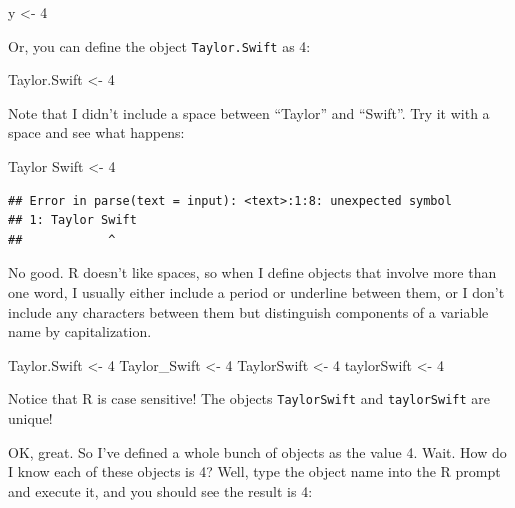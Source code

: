 \documentclass[
]{book}
\newenvironment{Shaded}{\begin{snugshade}}{\end{snugshade}}
\newcommand{\DecValTok}[1]{\textcolor[rgb]{0.00,0.00,0.81}{#1}}
\newcommand{\NormalTok}[1]{#1}
\newcommand{\OtherTok}[1]{\textcolor[rgb]{0.56,0.35,0.01}{#1}}
\begin{document}
\begin{Shaded}
\begin{Highlighting}[]
\NormalTok{y }\OtherTok{\textless{}{-}} \DecValTok{4}
\end{Highlighting}
\end{Shaded}

Or, you can define the object \texttt{Taylor.Swift} as 4:

\begin{Shaded}
\begin{Highlighting}[]
\NormalTok{Taylor.Swift }\OtherTok{\textless{}{-}} \DecValTok{4}
\end{Highlighting}
\end{Shaded}

Note that I didn't include a space between ``Taylor'' and ``Swift''. Try it with a space and see what happens:

\begin{Shaded}
\begin{Highlighting}[]
\NormalTok{Taylor Swift }\OtherTok{\textless{}{-}} \DecValTok{4}
\end{Highlighting}
\end{Shaded}

\begin{verbatim}
## Error in parse(text = input): <text>:1:8: unexpected symbol
## 1: Taylor Swift
##            ^
\end{verbatim}

No good. R doesn't like spaces, so when I define objects that involve more than one word, I usually either include a period or underline between them, or I don't include any characters between them but distinguish components of a variable name by capitalization.

\begin{Shaded}
\begin{Highlighting}[]
\NormalTok{Taylor.Swift }\OtherTok{\textless{}{-}} \DecValTok{4}
\NormalTok{Taylor\_Swift }\OtherTok{\textless{}{-}} \DecValTok{4}
\NormalTok{TaylorSwift }\OtherTok{\textless{}{-}} \DecValTok{4}
\NormalTok{taylorSwift }\OtherTok{\textless{}{-}} \DecValTok{4}
\end{Highlighting}
\end{Shaded}

Notice that R is case sensitive! The objects \texttt{TaylorSwift} and \texttt{taylorSwift} are unique!

OK, great. So I've defined a whole bunch of objects as the value 4. Wait. How do I know each of these objects is 4? Well, type the object name into the R prompt and execute it, and you should see the result is 4:
\end{document}
